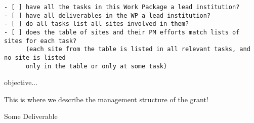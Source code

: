 \begin{draft}
\begin{verbatim}
- [ ] have all the tasks in this Work Package a lead institution?
- [ ] have all deliverables in the WP a lead institution?
- [ ] do all tasks list all sites involved in them?
- [ ] does the table of sites and their PM efforts match lists of sites for each task?
      (each site from the table is listed in all relevant tasks, and no site is listed
      only in the table or only at some task)
\end{verbatim}
\end{draft}

\begin{workpackage}[id=management,type=MGT,wphases=0-48!.2,
  title=Project Management,
  short=Management,
  lead=SRL,
  EGIRM=4,
  INSERMRM=4,
  QSRM=4,
  SILRM=4,
  SRLRM=24,
  UIORM=4,
  UPSUDRM=4,
  WTTRM=4,
  EuXFELRM=4,
  swsites
]
\begin{wpobjectives}
 \begin{compactitem}
   \item objective...
 \end{compactitem}
\end{wpobjectives}

\begin{wpdescription}

This is where we describe the management structure of the grant!

\end{wpdescription}

\begin{tasklist}
% 

\end{tasklist}


\begin{wpdelivs}
\begin{wpdeliv}[due=1,miles=startup,id=infrastructure,dissem=PU,nature=DEC,lead=SRL]
  {Some Deliverable}
\end{wpdeliv}

\end{wpdelivs}
\end{workpackage}

